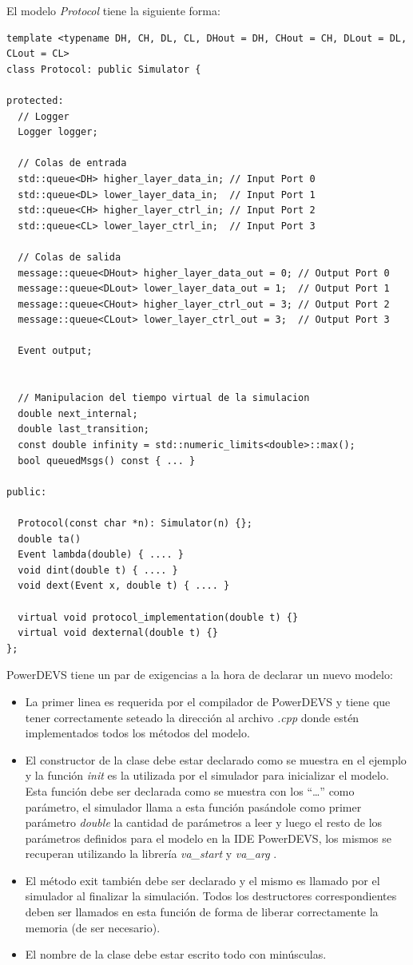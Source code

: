 \documentclass[10pt,a4paper]{article}
\begin{document}
El modelo \textit{Protocol} tiene la siguiente forma:
\begin{lstlisting}
template <typename DH, CH, DL, CL, DHout = DH, CHout = CH, DLout = DL, CLout = CL>
class Protocol: public Simulator { 

protected:
  // Logger
  Logger logger;

  // Colas de entrada
  std::queue<DH> higher_layer_data_in; // Input Port 0
  std::queue<DL> lower_layer_data_in;  // Input Port 1
  std::queue<CH> higher_layer_ctrl_in; // Input Port 2 
  std::queue<CL> lower_layer_ctrl_in;  // Input Port 3
  
  // Colas de salida
  message::queue<DHout> higher_layer_data_out = 0; // Output Port 0 
  message::queue<DLout> lower_layer_data_out = 1;  // Output Port 1
  message::queue<CHout> higher_layer_ctrl_out = 3; // Output Port 2
  message::queue<CLout> lower_layer_ctrl_out = 3;  // Output Port 3

  Event output;


  // Manipulacion del tiempo virtual de la simulacion 
  double next_internal;
  double last_transition;
  const double infinity = std::numeric_limits<double>::max();
  bool queuedMsgs() const { ... }

public:

  Protocol(const char *n): Simulator(n) {};
  double ta()
  Event lambda(double) { .... }
  void dint(double t) { .... }
  void dext(Event x, double t) { .... }
  
  virtual void protocol_implementation(double t) {}
  virtual void dexternal(double t) {}
};
\end{lstlisting}

PowerDEVS tiene un par de exigencias a la hora de declarar un nuevo modelo: \\

\begin{itemize}
\item La primer linea es requerida por el compilador de PowerDEVS y tiene que tener correctamente seteado la dirección al archivo \textit{.cpp} donde estén implementados todos los métodos del modelo.
\item El constructor de la clase debe estar declarado como se muestra en el ejemplo y la función \textit{init} es la utilizada por el simulador para inicializar el modelo. Esta función debe ser declarada como se muestra con los ``\ldots'' como parámetro, el simulador llama a esta función pasándole como primer parámetro \textit{double} la cantidad de parámetros a leer y luego el resto de los parámetros definidos para el modelo en la IDE PowerDEVS, los mismos se recuperan utilizando la librería \textit{va\_start} y \textit{va\_arg} \cite{vastart} \cite{vaarg}.
\item El método exit también debe ser declarado y el mismo es llamado por el simulador al finalizar la simulación. Todos los destructores correspondientes deben ser llamados en esta función de forma de liberar correctamente la memoria (de ser necesario).
\item El nombre de la clase debe estar escrito todo con minúsculas.
\end{itemize}
\end{document}
